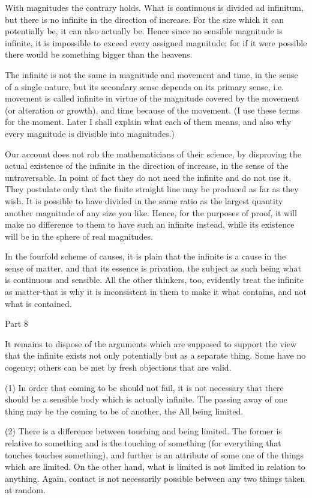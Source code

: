 With magnitudes the contrary holds. What is continuous is divided
ad infinitum, but there is no infinite in the direction of increase.
For the size which it can potentially be, it can also actually be.
Hence since no sensible magnitude is infinite, it is impossible to
exceed every assigned magnitude; for if it were possible there would
be something bigger than the heavens. 

The infinite is not the same in magnitude and movement and time, in
the sense of a single nature, but its secondary sense depends on its
primary sense, i.e. movement is called infinite in virtue of the magnitude
covered by the movement (or alteration or growth), and time because
of the movement. (I use these terms for the moment. Later I shall
explain what each of them means, and also why every magnitude is divisible
into magnitudes.) 

Our account does not rob the mathematicians of their science, by disproving
the actual existence of the infinite in the direction of increase,
in the sense of the untraversable. In point of fact they do not need
the infinite and do not use it. They postulate only that the finite
straight line may be produced as far as they wish. It is possible
to have divided in the same ratio as the largest quantity another
magnitude of any size you like. Hence, for the purposes of proof,
it will make no difference to them to have such an infinite instead,
while its existence will be in the sphere of real magnitudes.

In the fourfold scheme of causes, it is plain that the infinite is
a cause in the sense of matter, and that its essence is privation,
the subject as such being what is continuous and sensible. All the
other thinkers, too, evidently treat the infinite as matter-that is
why it is inconsistent in them to make it what contains, and not what
is contained. 

Part 8

It remains to dispose of the arguments which are supposed to support
the view that the infinite exists not only potentially but as a separate
thing. Some have no cogency; others can be met by fresh objections
that are valid. 

(1) In order that coming to be should not fail, it is not necessary
that there should be a sensible body which is actually infinite. The
passing away of one thing may be the coming to be of another, the
All being limited. 

(2) There is a difference between touching and being limited. The
former is relative to something and is the touching of something (for
everything that touches touches something), and further is an attribute
of some one of the things which are limited. On the other hand, what
is limited is not limited in relation to anything. Again, contact
is not necessarily possible between any two things taken at random.

